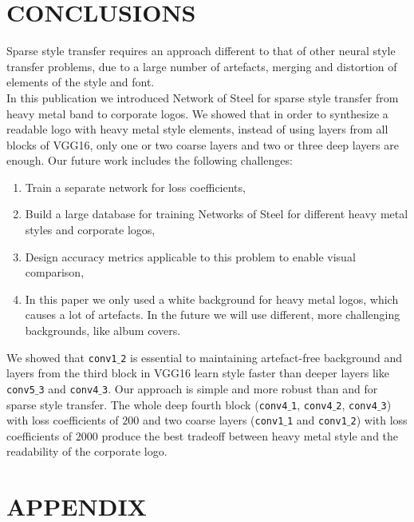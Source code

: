 \documentclass[a4paper,twoside]{article}
\begin{document}
\section{\uppercase{Conclusions}}
\label{sec:conclusion}
\noindent Sparse style transfer requires an approach different to that of other neural style transfer problems, due to a large number of artefacts, merging and distortion of elements of the style and font.\\ 

\noindent In this publication we introduced Network of Steel for sparse style transfer from heavy metal band to corporate logos. We showed that in order to synthesize a readable logo with heavy metal style elements, instead of using layers from all blocks of VGG16, only one or two coarse layers and two or three deep layers are enough. Our future work includes the following challenges:
\begin{enumerate}
    \item Train a separate network for loss coefficients,
    \item Build a large database for training Networks of Steel for different heavy metal styles and corporate logos,
    \item Design accuracy metrics applicable to this problem to enable visual comparison,
    \item In this paper we only used a white background for heavy metal logos, which causes a lot of artefacts. In the future we will use different, more challenging backgrounds, like album covers. 
\end{enumerate}
\noindent We showed that \texttt{conv1${}\_{}$2} is essential to maintaining artefact-free background and layers from the third block in VGG16 learn style faster than deeper layers like \texttt{conv5${}\_{}$3} and \texttt{conv4${}\_{}$3}. Our approach is simple and more robust than \cite{gatys2016image} and \cite{zhang2017multi} for sparse style transfer. The whole deep fourth block (\texttt{conv4${}\_{}$1}, \texttt{conv4${}\_{}$2}, \texttt{conv4${}\_{}$3}) with loss coefficients of $200$ and two coarse layers (\texttt{conv1${}\_{}$1} and \texttt{conv1${}\_{}$2}) with loss coefficients of $2000$ produce the best tradeoff between heavy metal style and the readability of the corporate logo.   


{\small
}


\section*{\uppercase{Appendix}}
\end{document}
